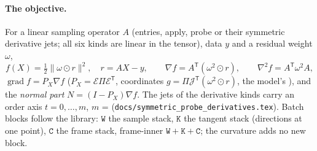 \documentclass[11pt]{article}
\newcommand{\Emap}{\mathcal{E}}
\newcommand{\Jac}{\mathcal{J}}
\newcommand{\grad}{\operatorname{grad}}
\newcommand{\T}{\mathsf{T}}
\theoremstyle{definition}
\theoremstyle{plain}
\begin{document}
\paragraph{The objective.} For a linear sampling operator $A$ (entries, apply, probe or their symmetric derivative
jets; all six kinds are linear in the tensor), data $y$ and a residual weight $\omega$,
\begin{equation}
  \label{eq:f}
  f(X) = \tfrac12\|\omega\odot r\|^2,\quad r = AX-y,\qquad
  \nabla f = A^\T(\omega^2\odot r),\qquad \nabla^2 f = A^\T\omega^2 A,
\end{equation}
$\grad f = P_X\nabla f$ ($P_X=\Emap\Pi\Emap^\T$, coordinates $g=\Pi\Jac^\T(\omega^2\odot r)$, the model's
), and the \emph{normal part} $N = (I-P_X)\nabla f$. The jets of the derivative kinds carry
an order axis $t=0,\dots,m$, $m$ =  (\texttt{docs/symmetric\_probe\_derivatives.tex}). Batch blocks follow
the library: $\mathtt W$ the sample stack, $\mathtt K$ the tangent stack (directions at one point), $\mathtt C$ the
frame stack, frame-inner $\mathtt{W+K+C}$; the curvature adds no new block.
\end{document}
